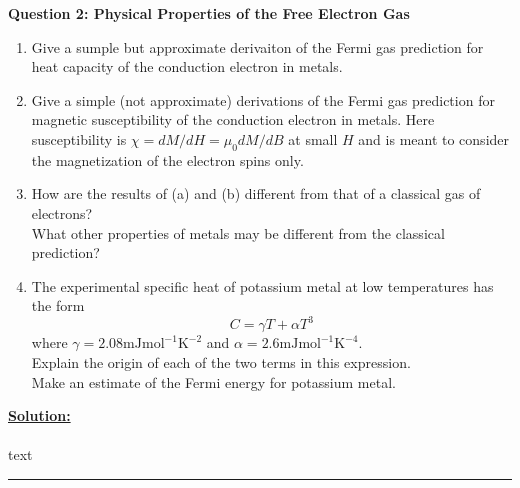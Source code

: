 \documentclass[11pt]{article}
\begin{document}
\begin{bluebox}
  \textbf{Question 2: Physical Properties of the Free Electron Gas}
  \begin{enumerate}[label=(\alph*)]
    \item Give a sumple but approximate derivaiton of the Fermi gas prediction for heat capacity of the conduction electron in metals.
    \item Give a simple (not approximate) derivations of the Fermi gas prediction for magnetic susceptibility of the conduction electron in metals. Here susceptibility is $\chi = dM/dH = \mu_0 dM/dB$ at small $H$ and is meant to consider the magnetization of the electron spins only.
    \item How are the results of (a) and (b) different from that of a classical gas of electrons? \\
    What other properties of metals may be different from the classical prediction?
    \item The experimental specific heat of potassium metal at low temperatures has the form $$ C = \gamma T + \alpha T^3 $$ where $\gamma = 2.08 \mathrm{mJ mol}^{-1}\mathrm{K}^{-2}$ and $\alpha = 2.6 \mathrm{mJ mol}^{-1}\mathrm{K}^{-4}$. \\
    Explain the origin of each of the two terms in this expression. \\
    Make an estimate of the Fermi energy for potassium metal.
  \end{enumerate} 
\end{bluebox}

\vskip 0.5cm
\textbf{\underline{Solution:}}
\\
\\
text
\vskip 0.5cm
\hrule
\pagebreak
\end{document}
